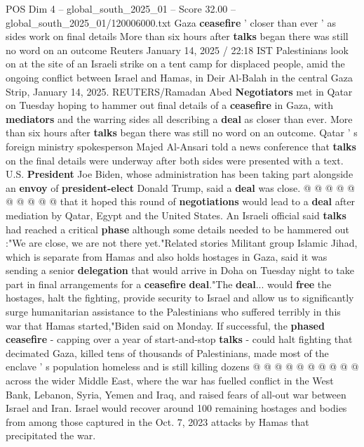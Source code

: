 \begin{textsample}{POS Dim 4 – global\_south\_2025\_01 – Score 32.00 – global\_south\_2025\_01/120006000.txt}  \label{ex:f4_pos_002}
Gaza \textbf{ceasefire} ' closer than ever ' as sides work on final details More than six hours after \textbf{talks} began there was still no word on an outcome Reuters January 14, 2025 / 22:18 IST Palestinians look on at the site of an Israeli strike on a tent camp for displaced people, amid the ongoing conflict between Israel and Hamas, in Deir Al-Balah in the central Gaza Strip, January 14, 2025.
REUTERS/Ramadan Abed \textbf{Negotiators} met in Qatar on Tuesday hoping to hammer out final details of a \textbf{ceasefire} in Gaza, with \textbf{mediators} and the warring sides all describing a \textbf{deal} as closer than ever.
More than six hours after \textbf{talks} began there was still no word on an outcome.
Qatar ' s foreign ministry spokesperson Majed Al-Ansari told a news conference that \textbf{talks} on the final details were underway after both sides were presented with a text.
U.S. \textbf{President} Joe Biden, whose administration has been taking part alongside an \textbf{envoy} of \textbf{president-elect} Donald Trump, said a \textbf{deal} was close. @ @ @ @ @ @ @ @ @ @ that it hoped this round of \textbf{negotiations} would lead to a \textbf{deal} after mediation by Qatar, Egypt and the United States.
An Israeli official said \textbf{talks} had reached a critical \textbf{phase} although some details needed to be hammered out :"We are close, we are not there yet."Related stories Militant group Islamic Jihad, which is separate from Hamas and also holds hostages in Gaza, said it was sending a senior \textbf{delegation} that would arrive in Doha on Tuesday night to take part in final arrangements for a \textbf{ceasefire} \textbf{deal}."The \textbf{deal}... would \textbf{free} the hostages, halt the fighting, provide security to Israel and allow us to significantly surge humanitarian assistance to the Palestinians who suffered terribly in this war that Hamas started,"Biden said on Monday.
If successful, the \textbf{phased} \textbf{ceasefire} - capping over a year of start-and-stop \textbf{talks} - could halt fighting that decimated Gaza, killed tens of thousands of Palestinians, made most of the enclave ' s population homeless and is still killing dozens @ @ @ @ @ @ @ @ @ @ across the wider Middle East, where the war has fuelled conflict in the West Bank, Lebanon, Syria, Yemen and Iraq, and raised fears of all-out war between Israel and Iran.
Israel would recover around 100 remaining hostages and bodies from among those captured in the Oct. 7, 2023 attacks by Hamas that precipitated the war.

\end{textsample}
